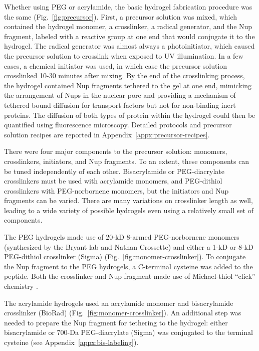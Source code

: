 Whether using PEG or acrylamide, the basic hydrogel fabrication procedure was the same (Fig.~\ref{fig:precursor}).  First, a precursor solution was mixed, which contained the hydrogel monomer, a crosslinker, a radical generator, and the Nup fragment, labeled with a reactive group at one end that would conjugate it to the hydrogel.  The radical generator was almost always a photoinitiator, which caused the precursor solution to crosslink when exposed to UV illumination.  In a few cases, a chemical initiator was used, in which case the precursor solution crosslinked 10-30 minutes after mixing.  By the end of the crosslinking process, the hydrogel contained Nup fragments tethered to the gel at one end, mimicking the arrangement of Nups in the nuclear pore and providing a mechanism of tethered bound diffusion for transport factors but not for non-binding inert proteins.  The diffusion of both types of protein within the hydrogel could then be quantified using fluorescence microscopy.  Detailed protocols and precursor solution recipes are reported in Appendix~\ref{appx:precursor-recipes}.

There were four major components to the precursor solution: monomers, crosslinkers, initiators, and Nup fragments.  To an extent, these components can be tuned independently of each other.  Bisacrylamide or PEG-diacrylate crosslinkers must be used with acrylamide monomers, and PEG-dithiol crosslinkers with PEG-norbornene monomers, but the initiators and Nup fragments can be varied.  There are many variations on crosslinker length as well, leading to a wide variety of possible hydrogels even using a relatively small set of components.

The PEG hydrogels made use of 20-kD 8-armed PEG-norbornene monomers (synthesized by the Bryant lab and Nathan Crossette) and either a 1-kD or 8-kD PEG-dithiol crosslinker (Sigma) (Fig.~\ref{fig:monomer-crosslinker}).  To conjugate the Nup fragment to the PEG hydrogels, a C-terminal cysteine was added to the peptide.  Both the crosslinker and Nup fragment made use of Michael-thiol ``click'' chemistry \cite{chatani14}\cite{nair14}.

The acrylamide hydrogels used an acrylamide monomer and bisacrylamide crosslinker (BioRad) (Fig.~\ref{fig:monomer-crosslinker}).  An additional step was needed to prepare the Nup fragment for tethering to the hydrogel: either bisacrylamide or 700-Da PEG-diacrylate (Sigma) was conjugated to the terminal cysteine (see Appendix~\ref{appx:bis-labeling}).

